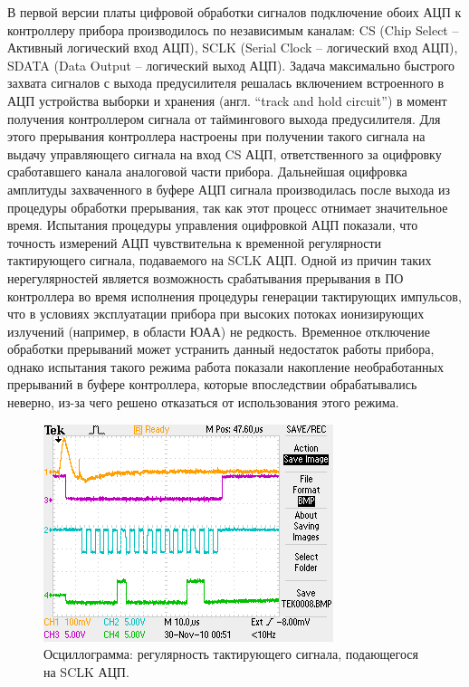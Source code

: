 В первой версии платы цифровой обработки сигналов подключение обоих АЦП к контроллеру прибора производилось по независимым каналам: CS (Chip Select -- Активный логический вход АЦП), SCLK (Serial Clock -- логический вход АЦП), SDATA (Data Output -- логический выход АЦП). Задача максимально быстрого захвата сигналов с выхода предусилителя решалась включением встроенного в АЦП устройства выборки и хранения (англ. ``track and hold circuit'') в момент получения контроллером сигнала от таймингового выхода предусилителя. Для этого прерывания контроллера настроены при получении такого сигнала на выдачу управляющего сигнала на вход CS АЦП, ответственного за оцифровку сработавшего канала аналоговой части прибора. Дальнейшая оцифровка амплитуды захваченного в буфере АЦП сигнала производилась после выхода из процедуры обработки прерывания, так как этот процесс отнимает значительное время. Испытания процедуры управления оцифровкой АЦП показали, что точность измерений АЦП чувствительна к временной регулярности тактирующего сигнала, подаваемого на SCLK АЦП. Одной из причин таких нерегулярностей является возможность срабатывания прерывания в ПО контроллера во время исполнения процедуры генерации тактирующих импульсов, что в условиях эксплуатации прибора при высоких потоках ионизирующих излучений (например, в области ЮАА) не редкость. Временное отключение обработки прерываний может устранить данный недостаток работы прибора, однако испытания такого режима работа показали накопление необработанных прерываний в буфере контроллера, которые впоследствии обрабатывались неверно, из-за чего решено отказаться от использования этого режима.

\begin{figure}
\centering
\includegraphics[width=0.7\linewidth]{images/TEK0008}
\caption{Осциллограмма: регулярность тактирующего сигнала, подающегося на SCLK АЦП.}
\label{fig:oscadc}
\end{figure}


